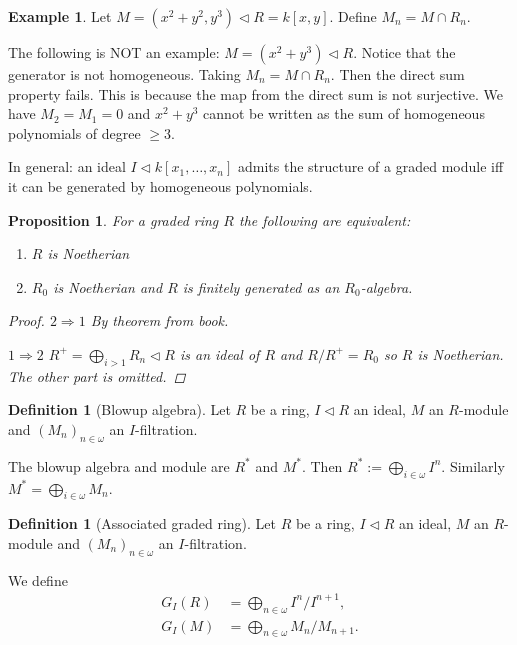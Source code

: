 \documentclass{article}
\newcommand{\ideal}{\triangleleft}
\newtheorem{proposition}[theorem]{Proposition}
\theoremstyle{definition}
\newtheorem{definition}[theorem]{Definition}
\newtheorem{example}[theorem]{Example}
\begin{document}
\begin{example}
    Let \(M=(x^{2}+y^{2},y^{3})\ideal R=k[x,y]\). Define \(M_{n}=M\cap R_{n}\).

    The following is NOT an example: \(M=(x^{2}+y^{3})\ideal R\). Notice that
    the generator is not homogeneous. Taking \(M_{n}=M\cap R_{n}\). Then the
    direct sum property fails. This is because the map from the direct sum is
    not surjective. We have \(M_{2}=M_{1}=0\) and \(x^{2}+y^{3}\) cannot be
    written as the sum of homogeneous polynomials of degree \(\geq 3\).

    In general: an ideal \(I\ideal k[x_{1},\ldots,x_{n}]\) admits the structure
    of a graded module iff it can be generated by homogeneous polynomials.
\end{example}

\begin{proposition}
    For a graded ring \(R\) the following are equivalent:
    \begin{enumerate}
        \item \(R\) is Noetherian
        \item \(R_{0}\) is Noetherian and \(R\) is finitely generated as an
              \(R_{0}\)-algebra.
    \end{enumerate}

    \begin{proof}
        \(2\Rightarrow1\) By theorem from book.

        \(1\Rightarrow 2\) \(R^{+}=\bigoplus_{i>1}R_{n}\ideal R\) is an ideal of
        \(R\) and  \(R/R^{+}=R_{0}\) so \(R\) is Noetherian. The other part is
        omitted.
    \end{proof}
\end{proposition}

\begin{definition}[Blowup algebra]
    Let \(R\) be a ring, \(I\ideal R\) an ideal, \(M\) an \(R\)-module and
    \((M_{n})_{n\in\omega}\) an \(I\)-filtration.

    The blowup algebra and module are \(R^{*}\) and \(M^{*}\). Then
    \(R^{*}:=\bigoplus_{i\in\omega}I^{n}\). Similarly
    \(M^{*}=\bigoplus_{i\in\omega}M_{n}\).
\end{definition}

\begin{definition}[Associated graded ring]
    Let \(R\) be a ring, \(I\ideal R\) an ideal, \(M\) an \(R\)-module and
    \((M_{n})_{n\in\omega}\) an \(I\)-filtration.

    We define
    \begin{align*}
        G_{I}(R) & =\bigoplus_{n\in\omega}I^{n}/I^{n+1}, \\
        G_{I}(M) & =\bigoplus_{n\in\omega}M_{n}/M_{n+1}.
    \end{align*}
\end{definition}
\end{document}
